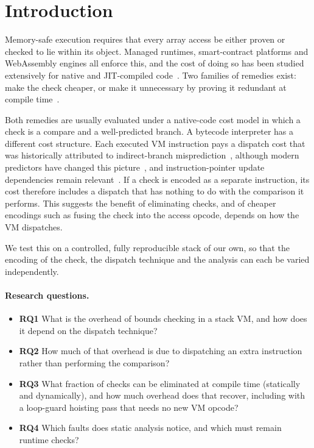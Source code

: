 \documentclass[11pt,a4paper]{article}
\begin{document}
\section{Introduction}
Memory-safe execution requires that every array access be either proven or checked to lie within its object. Managed runtimes, smart-contract platforms and WebAssembly engines all enforce this, and the cost of doing so has been studied extensively for native and JIT-compiled code~\cite{haas2017,jangda2019,nagarakatte2009,serebryany2012,akritidis2009}. Two families of remedies exist: make the check cheaper, or make it unnecessary by proving it redundant at compile time~\cite{suzuki1977,gupta1993,kolte1995,bodik2000,midkiff1998,wurthinger2009}.

Both remedies are usually evaluated under a native-code cost model in which a check is a compare and a well-predicted branch. A bytecode interpreter has a different cost structure. Each executed VM instruction pays a dispatch cost that was historically attributed to indirect-branch misprediction~\cite{proebsting1995,ertl2003,casey2007}, although modern predictors have changed this picture~\cite{rohou2015}, and instruction-pointer update dependencies remain relevant~\cite{ertl2024}. If a check is encoded as a separate instruction, its cost therefore includes a dispatch that has nothing to do with the comparison it performs. This suggests the benefit of eliminating checks, and of cheaper encodings such as fusing the check into the access opcode, depends on how the VM dispatches.

We test this on a controlled, fully reproducible stack of our own, so that the encoding of the check, the dispatch technique and the analysis can each be varied independently.

\paragraph{Research questions.}
\begin{itemize}
\item \textbf{RQ1} What is the overhead of bounds checking in a stack VM, and how does it depend on the dispatch technique?
\item \textbf{RQ2} How much of that overhead is due to dispatching an extra instruction rather than performing the comparison?
\item \textbf{RQ3} What fraction of checks can be eliminated at compile time (statically and dynamically), and how much overhead does that recover, including with a loop-guard hoisting pass that needs no new VM opcode?
\item \textbf{RQ4} Which faults does static analysis notice, and which must remain runtime checks?
\end{itemize}
\end{document}
